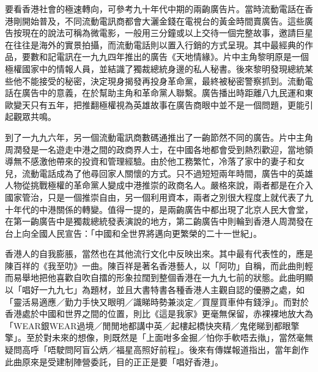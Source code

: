 要看香港社會的極速轉向，可參考九十年代中期的兩齣廣告片。當時流動電話在香港剛開始普及，不同流動電訊商都會大灑金錢在電視台的黃金時間賣廣告。這些廣告按現在的說法可稱為微電影，一般用三分鐘或以上交待一個完整故事，邀請巨星在往往是海外的實景拍攝，而流動電話則以置入行銷的方式呈現。其中最經典的作品，要數和記電訊在一九九四年推出的廣告《天地情緣》。片中主角黎明原是一個極權國家中的情報人員，並結識了獨裁總統身邊的私人秘書。後來黎明發現總統某些他不能接受的秘密，決定現身揭發再投身革命黨，最終被秘密警察抓到。流動電話在廣告中的意義，在於幫助主角和革命黨人聯繫。廣告播出時距離八九民運和東歐變天只有五年，把推翻極權視為英雄故事在廣告商眼中並不是一個問題，更能引起觀眾共鳴。


到了一九九六年，另一個流動電訊商數碼通推出了一齣節然不同的廣告。片中主角周潤發是一名遊走中港之間的政商界人士，在中國各地都會受到熱烈歡迎，當地領導無不感激他帶來的投資和管理經驗。由於他工務繁忙，冷落了家中的妻子和女兒，流動電話成為了他尋回家人關懷的方式。只不過短短兩年時間，廣告中的英雄人物從挑戰極權的革命黨人變成中港推崇的政商名人。嚴格來說，兩者都是在介入國家管治，只是一個推崇自由，另一個利用資本，兩者之別很大程度上就代表了九十年代的中港關係的轉變。值得一提的，是兩齣廣告中都出現了北京人民大會堂，在第一齣廣告中是獨裁總統發表演說的地方，第二齣廣告中則輪到香港人周潤發在台上向全國人民宣告：「中國和全世界將邁向更繁榮的二十一世紀」。


香港人的自我膨脹，當然也在其他流行文化中反映出來。其中最有代表性的，應是陳百祥的《我至叻》一曲。陳百祥是著名香港藝人，以「阿叻」自稱，而此曲則輕而易舉地把他喜歡自吹自擂的形象拉闊到整個香港在一九九七前的狀態。此曲明顯以「唱好一九九七」為題材，並且大書特書各種香港人主觀自認的優勝之處，如「靈活易適應／勤力手快又眼明／識睇時勢兼淡定／買屋買車仲有錢淨」。而對於香港處於中國和世界之間的位置，則比《這是我家》更毫無保留，赤裸裸地放大為「WEAR銀WEAR過境／閒閒地都講中英／起樓起橋快夾精／鬼佬睇到都眼擎擎」。至於對未來的想像，則既然是「上面咁多金掘／怕你手軟唔去𢴇」，當然毫無疑問高呼「唔駛問阿盲公炳／福星高照好前程」。後來有傳媒報道指出，當年創作此曲原來是受建制陣營委託，目的正正是要「唱好香港」。

